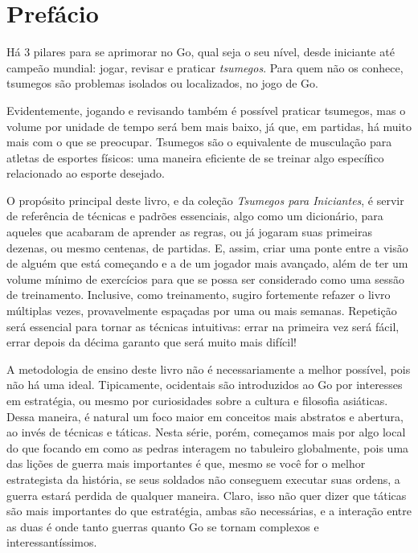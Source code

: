 \chapter{Prefácio}

Há 3 pilares para se aprimorar no Go, qual seja o seu nível, desde iniciante até campeão mundial: jogar, revisar e praticar \emph{tsumegos}. Para quem não os conhece, tsumegos são problemas isolados ou localizados, no jogo de Go.

Evidentemente, jogando e revisando também é possível praticar tsumegos, mas o volume por unidade de tempo será bem mais baixo, já que, em partidas, há muito mais com o que se preocupar. Tsumegos são o equivalente de musculação para atletas de esportes físicos: uma maneira eficiente de se treinar algo específico relacionado ao esporte desejado.

O propósito principal deste livro, e da coleção \emph{Tsumegos para Iniciantes}, é servir de referência de técnicas e padrões essenciais, algo como um dicionário, para aqueles que acabaram de aprender as regras, ou já jogaram suas primeiras dezenas, ou mesmo centenas, de partidas. E, assim, criar uma ponte entre a visão de alguém que está começando e a de um jogador mais avançado, além de ter um volume mínimo de exercícios para que se possa ser considerado como uma sessão de treinamento. Inclusive, como treinamento, sugiro fortemente refazer o livro múltiplas vezes, provavelmente espaçadas por uma ou mais semanas. Repetição será essencial para tornar as técnicas intuitivas: errar na primeira vez será fácil, errar depois da décima garanto que será muito mais difícil!

A metodologia de ensino deste livro não é necessariamente a melhor possível, pois não há uma ideal. Tipicamente, ocidentais são introduzidos ao Go por interesses em estratégia, ou mesmo por curiosidades sobre a cultura e filosofia asiáticas. Dessa maneira, é natural um foco maior em conceitos mais abstratos e abertura, ao invés de técnicas e táticas. Nesta série, porém, começamos mais por algo local do que focando em como as pedras interagem no tabuleiro globalmente, pois uma das lições de guerra mais importantes é que, mesmo se você for o melhor estrategista da história, se seus soldados não conseguem executar suas ordens, a guerra estará perdida de qualquer maneira. Claro, isso não quer dizer que táticas são mais importantes do que estratégia, ambas são necessárias, e a interação entre as duas é onde tanto guerras quanto Go se tornam complexos e interessantíssimos.

